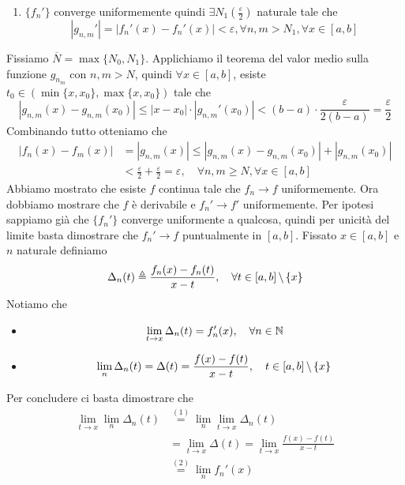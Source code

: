 \documentclass[a4paper]{article}
\begin{document}
\begin{snippetproof}{}
\begin{enumerate}
        \[
            |g_{n,m}(x_0)| = |f_n(x_0) - f_m(x_0)| < \frac{\varepsilon}{2(b-a)}, \quad \forall n,m>N_0, \forall x \in [a,b]
        \]
        \item \(\{f_n'\}\) converge uniformemente quindi \(\exists N_1\left(\frac{\varepsilon}{2}\right)\) naturale
        tale che 
        \[
            |g_{n,m}'| = |f_n'(x) - f_n'(x)| < \varepsilon,  \forall n,m>N_1, \forall x \in [a,b]
        \]
    \end{enumerate}
    Fissiamo \(\overline N = \max\{N_0, N_1\}\). Applichiamo il teorema del valor medio sulla funzione
    \(g_{n_m}\) con \(n,m > N\), quindi \(\forall x \in [a,b]\), esiste \(t_0 \in \left(\min\{x,x_0\}, \max\{x,x_0\}\right)\) tale che
    \[
        |g_{n,m}(x) - g_{n,m}(x_0)| \leq |x-x_0| \cdot |g_{n,m}'(x_0)| < (b-a) \cdot \frac{\varepsilon}{2(b-a)} = \frac{\varepsilon}{2}
    \]
    Combinando tutto otteniamo che
    \begin{align*}
        |f_n(x) - f_m(x)| &= |g_{n,m}(x)| \leq |g_{n,m}(x) - g_{n,m}(x_0)| + |g_{n,m}(x_0)| \\
        &< \frac{\varepsilon}{2} + \frac{\varepsilon}{2} = \varepsilon, \quad \forall n,m \geq N, \forall x \in [a,b]
    \end{align*}
    Abbiamo mostrato che esiste \(f\) continua tale che \(f_n \to f\) uniformemente.
    Ora dobbiamo mostrare che \(f\) è derivabile e \(f_n' \to f'\) uniformemente.
    Per ipotesi sappiamo già che \(\{f_n'\}\) converge uniformente
    a qualcosa, quindi per unicità del limite basta dimostrare che \(f_n' \to f\) puntualmente in \([a,b]\).
    Fissato \(x\in [a,b]\) e \(n\) naturale definiamo
    \[
        \Delta_n (t) \triangleq \frac{f_n(x) - f_n(t)}{x-t}, \quad \forall t \in [a,b] \,\backslash\, \{x\}
    \]
    Notiamo che
    \begin{itemize}
        \item \[ \lim_{t\to x} \Delta_n(t) = f_n'(x), \quad \forall n \in \mathbb{N} \]
        \item \[ \lim_n \Delta_n(t) = \Delta(t) = \frac{f(x) - f(t)}{x-t}, \quad t \in [a,b] \,\backslash\, \{x\} \]
    \end{itemize}
    Per concludere ci basta dimostrare che
    \begin{align*}
        \lim_{t\to x} \lim_n \Delta_n(t) &\overset{(1)}{=} \lim_n \lim_{t \to x} \Delta_n(t) \\
        &= \lim_{t\to x} \Delta(t) = \lim_{t\to x} \frac{f(x) - f(t)}{x-t} \\
        &\overset{(2)}{=} \lim_{n} f_n'(x)

\end{align*}
\end{snippetproof}
\end{document}
